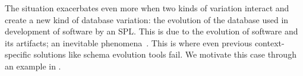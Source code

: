 The situation exacerbates even more when two kinds of variation
interact and create a new kind of database variation: the evolution of
the database used in development of software by an SPL.
This is due to the evolution of software and its
artifacts; an inevitable phenomena~\cite{dbSPLevolve}. 
This is where even previous context-specific solutions like schema evolution
tools fail.
We motivate this case through an example in .

